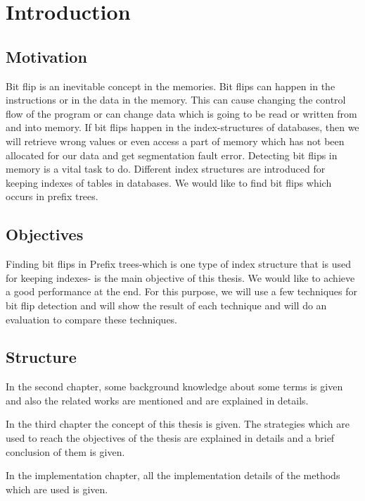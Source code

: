 \documentclass{report}
\begin{document}

\tableofcontents

\chapter{Introduction}

\section{Motivation}

Bit flip is an inevitable concept in the memories. Bit flips can happen in the instructions or in the data in the memory. This can cause changing the control flow of the program or can change data which is going to be read or written from and into memory. If bit flips happen in the index-structures of databases, then we will retrieve wrong values or even access a part of memory which has not been allocated for our data and get segmentation fault error. Detecting bit flips in memory is a vital task to do. Different index structures are introduced for keeping indexes of tables in databases. We would like to find bit flips which occurs in prefix trees.  

\section{Objectives}

Finding bit flips in Prefix trees-which is one type of index structure that is used for keeping indexes- is the main objective of this thesis. We would like to achieve a good performance at the end. For this purpose, we will use a few techniques for bit flip detection and will show the result of each technique and will do an evaluation to compare these techniques.

\section{Structure}

In the second chapter, some background knowledge about some terms is given and also the related works are mentioned and are explained in details.

In the third chapter the concept of this thesis is given. The strategies which are used to reach the objectives of the thesis are explained in details and a brief conclusion of them is given. 

In the implementation chapter, all the implementation details of the methods which are used is given. 
\end{document}
